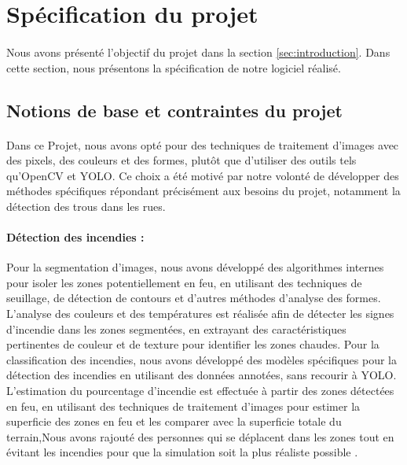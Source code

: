 \newpage
\section{Spécification du projet}
\label{sec:specification}

\paragraph{} Nous avons présenté l'objectif du projet dans la section \ref{sec:introduction}. Dans cette section, nous présentons la spécification de notre logiciel réalisé.

\subsection{Notions de base et contraintes du projet}
\paragraph{}

Dans ce Projet, nous avons opté pour des techniques de traitement d'images avec des pixels, des couleurs et des formes, plutôt que d'utiliser des outils tels qu'OpenCV et YOLO. Ce choix a été motivé par notre volonté de développer des méthodes spécifiques répondant précisément aux besoins du projet, notamment la détection des trous dans les rues.

\paragraph{Détection des incendies :} 

Pour la segmentation d'images, nous avons développé des algorithmes internes pour isoler les zones potentiellement en feu, en utilisant des techniques de seuillage, de détection de contours et d'autres méthodes d'analyse des formes.
L'analyse des couleurs et des températures est réalisée afin de détecter les signes d'incendie dans les zones segmentées, en extrayant des caractéristiques pertinentes de couleur et de texture pour identifier les zones chaudes.
Pour la classification des incendies, nous avons développé des modèles spécifiques pour la détection des incendies en utilisant des données annotées, sans recourir à YOLO.
L'estimation du pourcentage d'incendie est effectuée à partir des zones détectées en feu, en utilisant des techniques de traitement d'images pour estimer la superficie des zones en feu et les comparer avec la superficie totale du terrain,Nous avons rajouté des personnes qui se déplacent dans les zones tout en évitant les incendies pour que la simulation soit la plus réaliste possible .
